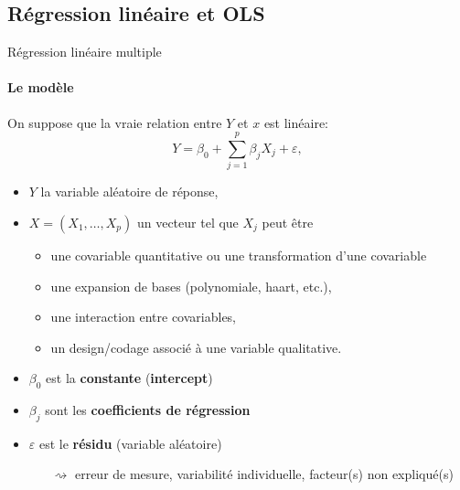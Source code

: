 \documentclass{beamer}\usepackage[]{graphicx}\usepackage[]{color}
\begin{document}
\subsection{Régression linéaire et OLS}

\begin{frame}{Régression linéaire multiple}
  \framesubtitle{Le modèle}
  
  On suppose que la vraie relation entre $Y$ et $x$ est linéaire:  
  \[Y = \beta_0 + \sum_{j=1}^p\beta_j X_j + \varepsilon,\]

  \begin{itemize}
  \item $Y$ la variable aléatoire de réponse,
  \item $X = (X_1, \dots, X_p)$ un vecteur tel que $X_j$ peut être
      \begin{itemize}
      \item une covariable quantitative ou une transformation d'une covariable
      \item une expansion de bases (polynomiale, haart, etc.),
      \item une interaction entre covariables,
      \item un design/codage associé à une variable qualitative.
      \end{itemize}
  \item $\beta_0$ est la \alert{\bf constante} (\alert{\bf intercept})
  \item $\beta_j$ sont les \alert{\bf coefficients de régression}
  \item $\varepsilon$ est le \alert{\bf résidu} (variable aléatoire)\\
    \begin{itemize}
    \item[$\rightsquigarrow$] erreur de mesure, variabilité individuelle, facteur(s) non expliqué(s)
    \end{itemize}
  \end{itemize}

\end{frame}
\end{document}

